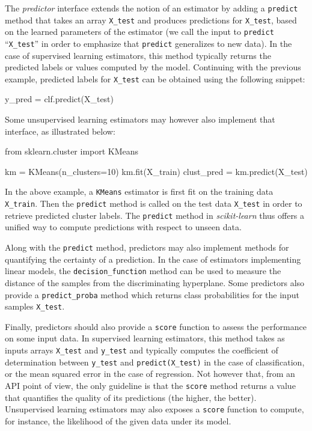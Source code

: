 \documentclass{llncs}
\newcommand{\sklearn}{\textit{scikit-learn}\xspace}
\begin{document}
The \textit{predictor} interface extends the notion of an estimator
by adding a \texttt{predict}
method that takes an array \texttt{X\_test} and produces
predictions for \texttt{X\_test}, based on the learned parameters of the
estimator (we call the input to \texttt{predict} ``\texttt{X\_test}'' in order
to emphasize that \texttt{predict} generalizes to new data). In the case of
supervised learning estimators, this method typically returns the predicted
labels or values computed by the model.  Continuing with the previous example,
predicted labels for \texttt{X\_test} can be obtained using the following
snippet:
\begin{pythoncode}
y_pred = clf.predict(X_test)
\end{pythoncode}
Some unsupervised learning
estimators may however also implement that interface, as illustrated below:
\begin{pythoncode}
from sklearn.cluster import KMeans

km = KMeans(n_clusters=10)
km.fit(X_train)
clust_pred = km.predict(X_test)
\end{pythoncode}
In the above example, a \texttt{KMeans} estimator is first fit on the training
data \texttt{X\_train}. Then the \texttt{predict} method is called on the test
data \texttt{X\_test} in order to retrieve predicted cluster labels.
The \texttt{predict} method in \sklearn thus offers a unified way
to compute predictions with respect to unseen data.

Along with the \texttt{predict} method, predictors may also implement methods
for quantifying the certainty of a prediction. In the case of estimators
implementing linear models, the \texttt{decision\_function} method can be used
to measure the distance of the samples from the discriminating hyperplane. Some
predictors also provide a \texttt{predict\_proba} method which returns
class probabilities for the input samples \texttt{X\_test}.

Finally, predictors should also provide a \texttt{score} function to assess the
performance on some input data. In supervised learning estimators, this method
takes as inputs arrays \texttt{X\_test} and \texttt{y\_test} and typically
computes the coefficient of determination between \texttt{y\_test} and
\texttt{predict(X\_test)} in the case of classification, or the mean squared
error in the case of regression. Not however that, from an API point of view,
the only guideline is that the \texttt{score} method returns a value
that quantifies the quality of its predictions (the higher, the better).
Unsupervised learning estimators may also exposes a \texttt{score} function
to compute, for instance, the likelihood of the given data under its model.
\end{document}
